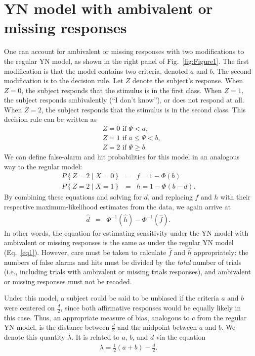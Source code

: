 \documentclass[man]{apa6}
\begin{document}
\section{YN model with ambivalent or missing responses}
One can account for ambivalent or missing responses with two modifications to the regular YN model, as shown in the right panel of Fig.~\ref{fig:Figure1}. The first modification is that the model contains two criteria, denoted $a$ and $b$. The second modification is to the decision rule. Let $Z$ denote the subject's response. When $Z=0$, the subject responds that the stimulus is in the first class. When $Z=1$, the subject responds ambivalently (``I don't know''), or does not respond at all. When $Z=2$, the subject responds that the stimulus is in the second class. This decision rule can be written as
\begin{eqnarray*}
&Z=0\textrm{ if }\Psi<a\textrm{,}\\
&Z=1\textrm{ if }a\le\Psi<b\textrm{,}\\
&Z=2\textrm{ if }\Psi\ge{}b\textrm{.}
\end{eqnarray*} 
We can define false-alarm and hit probabilities for this model in an analogous way to the regular model:
\begin{eqnarray*}
P\left\{Z=2\mid{}X=0\right\}&=&f=1-\Phi\left(b\right)\\
P\left\{Z=2\mid{}X=1\right\}&=&h=1-\Phi\left(b-d\right)\textrm{.}
\end{eqnarray*}
By combining these equations and solving for $d$, and replacing $f$ and $h$ with their respective maximum-likelihood estimates from the data, we again arrive at
\begin{eqnarray*}
\hat{d}&=&\Phi^{-1}\left(\hat{h}\right)-\Phi^{-1}\left(\hat{f}\right)\textrm{.}
\end{eqnarray*}In other words, the equation for estimating sensitivity under the YN model with ambivalent or missing responses is the same as under the regular YN model (Eq.~\ref{eq1}). However, care must be taken to calculate $\hat{f}$ and $\hat{h}$ appropriately: the numbers of false alarms and hits must be divided by the \emph{total} number of trials (i.e., including trials with ambivalent or missing trials responses), and ambivalent or missing responses must not be recoded.

Under this model, a subject could be said to be unbiased if the criteria $a$ and $b$ were centered on $\frac{d}{2}$, since both affirmative responses would be equally likely in this case. Thus, an appropriate measure of bias, analogous to $c$ from the regular YN model, is the distance between $\frac{d}{2}$ and the midpoint between $a$ and $b$. We denote this quantity $\lambda$. It is related to $a$, $b$, and $d$ via the equation
\begin{eqnarray*}\lambda=\frac{1}{2}\left(a+b\right)-\frac{d}{2}\textrm{.}\end{eqnarray*}
\end{document}
